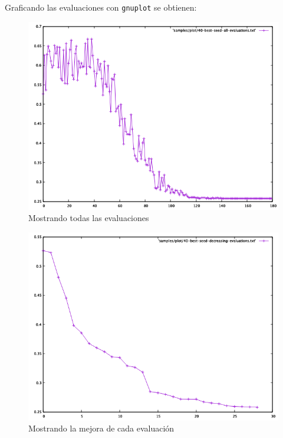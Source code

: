 \documentclass{article}
\begin{document}
Graficando las evaluaciones con \texttt{gnuplot} se obtienen:
\begin{figure}[H]
  \centering
  \includegraphics[scale=0.45]{assets/img/40-best-seed-all-evaluations.png}
  \caption{Mostrando todas las evaluaciones}
\end{figure}

\begin{figure}[H]
  \centering
  \includegraphics[scale=0.45]{assets/img/40-best-seed-decreasing-evaluations.png}
  \caption{Mostrando la mejora de cada evaluación}
\end{figure}
\end{document}
